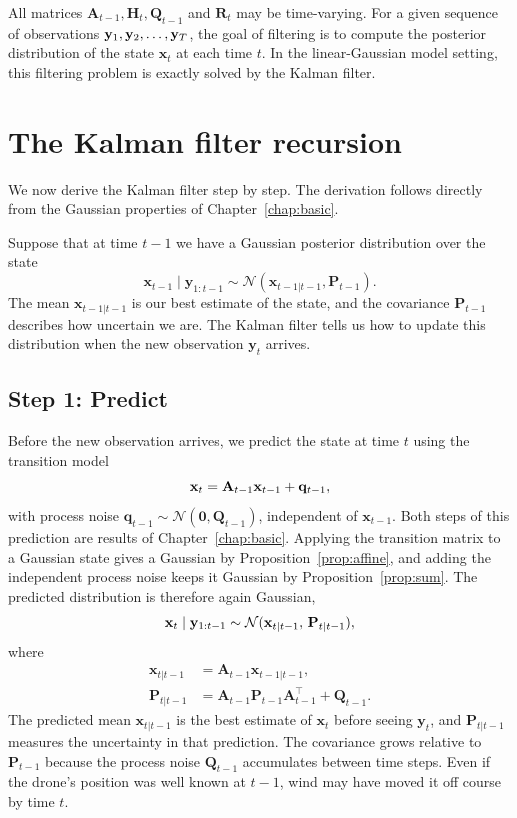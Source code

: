 All matrices $\mathbf{A}_{t-1}, \mathbf{H}_t, \mathbf{Q}_{t-1}$ and $\mathbf{R}_t$ may be time-varying. For a given sequence of observations $\mathbf{y}_1, \mathbf{y}_2, \dots, \mathbf{y}_T$, the goal of filtering is to compute the posterior distribution of the state $\mathbf{x}_t$ at each time $t$. In the linear-Gaussian model setting, this filtering problem is exactly solved by the Kalman filter.


\section{The Kalman filter recursion} %
We now derive the Kalman filter step by step. The derivation follows directly from the Gaussian properties of Chapter~\ref{chap:basic}.

Suppose that at time $t-1$ we have a Gaussian posterior distribution over the state 
\[
\mathbf{x}_{t-1} \mid \mathbf{y}_{1:t-1} \sim \mathcal{N}(\mathbf{x}_{t-1|t-1}, \mathbf{P}_{t-1}).
\]
The mean  $\mathbf{x}_{t-1|t-1}$ is our best estimate of the state, and the covariance $\mathbf{P}_{t-1}$ describes how uncertain we are. The Kalman filter tells us how to update this distribution when the new observation $\mathbf{y}_{t}$ arrives.

\subsection*{Step 1: Predict}
Before the new observation arrives, we predict the state at time $t$ using the transition model
\[
\mathbf{x}_t = \mathbf{A}_{t-1}\mathbf{x}_{t-1} + \mathbf{q}_{t-1},
\]
with process noise $\mathbf{q}_{t-1} \sim \mathcal{N}(\mathbf{0}, \mathbf{Q}_{t-1})$, independent of $\mathbf{x}_{t-1}$. Both steps of this prediction are results of Chapter~\ref{chap:basic}. Applying the transition matrix to a Gaussian state gives a Gaussian by Proposition~\ref{prop:affine}, and adding the independent process noise keeps it Gaussian by Proposition~\ref{prop:sum}. The predicted distribution is therefore again Gaussian,
\begin{equation}\label{eq:kalman predict}
  \mathbf{x}_t \mid \mathbf{y}_{1:t-1}
  \sim \mathcal{N}(\mathbf{x}_{t|t-1},\, \mathbf{P}_{t|t-1}),
\end{equation}
where
\begin{align}
    \mathbf{x}_{t|t-1} &= \mathbf{A}_{t-1}\mathbf{x}_{t-1|t-1}, \label{eq:predict_mean} \\ 
    \mathbf{P}_{t|t-1} &= \mathbf{A}_{t-1}\mathbf{P}_{t-1}\mathbf{A}_{t-1}^\top + \mathbf{Q}_{t-1}. \label{eq:predict_cov}
\end{align}
The predicted mean $\mathbf{x}_{t|t-1}$ is the best estimate of $\mathbf{x}_{t}$ before seeing $\mathbf{y}_{t}$, and $\mathbf{P}_{t|t-1}$ measures the uncertainty in that prediction. The covariance grows relative to $\mathbf{P}_{t-1}$ because the process noise $\mathbf{Q}_{t-1}$ accumulates between time steps. Even if the drone's position was well known at $t-1$, wind may have moved it off course by time $t$.

